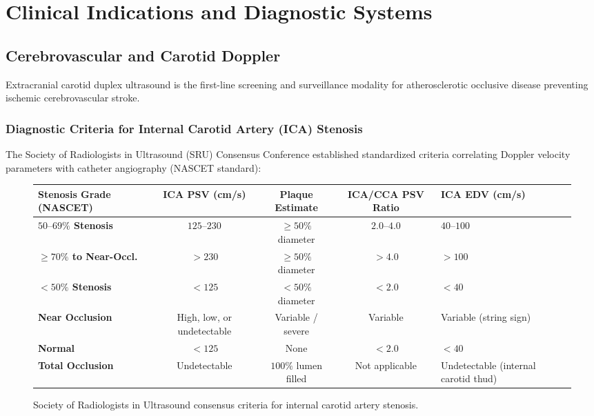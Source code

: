 \documentclass[11pt,a4paper]{article}
\begin{document}
\section{Clinical Indications and Diagnostic Systems}

\subsection{Cerebrovascular and Carotid Doppler}

Extracranial carotid duplex ultrasound is the first-line screening and surveillance modality for atherosclerotic occlusive disease preventing ischemic cerebrovascular stroke.

\subsubsection{Diagnostic Criteria for Internal Carotid Artery (ICA) Stenosis}
The Society of Radiologists in Ultrasound (SRU) Consensus Conference established standardized criteria correlating Doppler velocity parameters with catheter angiography (NASCET standard):

\begin{figure}[htbp]
\centering
\begin{tabular}{p{3.8cm}cccp{4.2cm}}
\toprule
\textbf{Stenosis Grade (NASCET)} & \textbf{ICA PSV (cm/s)} & \textbf{Plaque Estimate} & \textbf{ICA/CCA PSV Ratio} & \textbf{ICA EDV (cm/s)} \\
\midrule
\textbf{$50\text{--}69\%$ Stenosis} & $125\text{--}230$ & $\ge 50\%$ diameter & $2.0\text{--}4.0$ & $40\text{--}100$ \\
\textbf{$\ge 70\%$ to Near-Occl.} & $> 230$ & $\ge 50\%$ diameter & $> 4.0$ & $> 100$ \\
\textbf{$< 50\%$ Stenosis} & $< 125$ & $< 50\%$ diameter & $< 2.0$ & $< 40$ \\
\textbf{Near Occlusion} & High, low, or undetectable & Variable / severe & Variable & Variable (string sign) \\
\textbf{Normal} & $< 125$ & None & $< 2.0$ & $< 40$ \\
\textbf{Total Occlusion} & Undetectable & $100\%$ lumen filled & Not applicable & Undetectable (internal carotid thud) \\
\bottomrule
\end{tabular}
\caption{Society of Radiologists in Ultrasound consensus criteria for internal carotid artery stenosis.}
\label{tab:carotid_criteria}
\end{figure}
\end{document}
